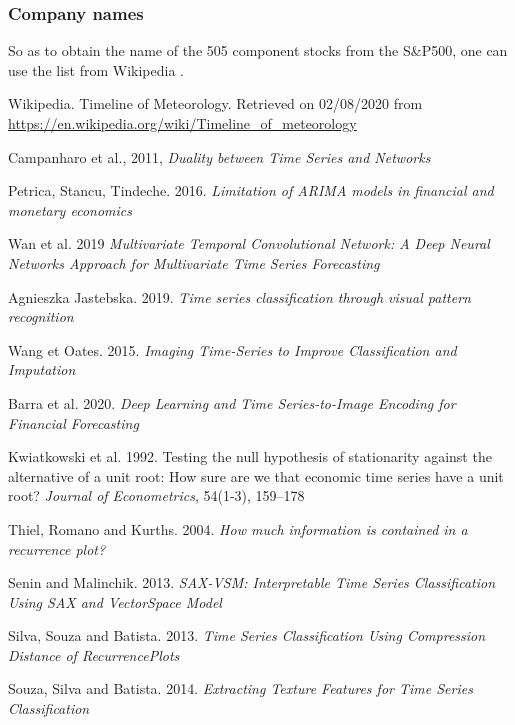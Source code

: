 \documentclass[11pt]{article}
\begin{document}
\begin{onehalfspace}
\subsubsection{Company names}

So as to obtain the name of the 505 component stocks from the S\&P500, one can use the list from Wikipedia \cite{500names}.

\pagebreak

\begin{thebibliography}{9}
    Wikipedia. Timeline of Meteorology. Retrieved on 02/08/2020 from \url{https://en.wikipedia.org/wiki/Timeline_of_meteorology}

    Campanharo et al., 2011, \textit{Duality between Time Series and Networks}

    Petrica, Stancu, Tindeche. 2016. \textit{Limitation of ARIMA models in financial and monetary economics}

    Wan et al. 2019 \textit{Multivariate Temporal Convolutional Network: A Deep Neural Networks Approach for Multivariate Time Series Forecasting}

    Agnieszka Jastebska. 2019. \textit{Time series classification through visual pattern recognition}

    Wang et Oates. 2015. \textit{Imaging Time-Series to Improve Classification and Imputation}

    Barra et al. 2020. \textit{Deep Learning and Time Series-to-Image Encoding for Financial Forecasting}

    Kwiatkowski et al. 1992. Testing the null hypothesis of stationarity against the alternative of a unit root: How sure are we that economic time series have a unit root? \textit{Journal of Econometrics}, 54(1-3), 159–178

    Thiel, Romano and Kurths. 2004. \textit{How much information is contained in a recurrence plot?}

    Senin and Malinchik. 2013. \textit{SAX-VSM: Interpretable Time Series Classification Using SAX and VectorSpace Model}

    Silva, Souza and Batista. 2013. \textit{ Time  Series  Classification  Using  Compression  Distance  of  RecurrencePlots}

    Souza, Silva and Batista. 2014. \textit{Extracting Texture Features for Time Series Classification}


\end{thebibliography}
\end{onehalfspace}
\end{document}
